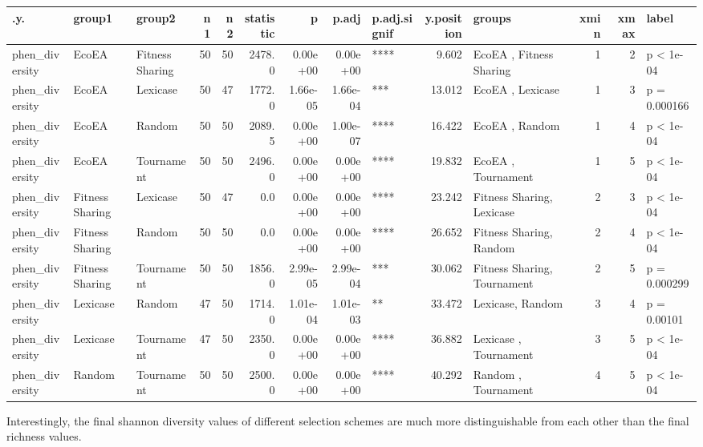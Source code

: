 \documentclass[]{book}
\begin{document}
\begin{table}
\centering
\begin{tabular}[t]{l|l|l|r|r|r|r|r|l|r|l|r|r|l}
\hline
.y. & group1 & group2 & n1 & n2 & statistic & p & p.adj & p.adj.signif & y.position & groups & xmin & xmax & label\\
\hline
phen\_diversity & EcoEA & Fitness Sharing & 50 & 50 & 2478.0 & 0.00e+00 & 0.00e+00 & **** & 9.602 & EcoEA          , Fitness Sharing & 1 & 2 & p < 1e-04\\
\hline
phen\_diversity & EcoEA & Lexicase & 50 & 47 & 1772.0 & 1.66e-05 & 1.66e-04 & *** & 13.012 & EcoEA   , Lexicase & 1 & 3 & p = 0.000166\\
\hline
phen\_diversity & EcoEA & Random & 50 & 50 & 2089.5 & 0.00e+00 & 1.00e-07 & **** & 16.422 & EcoEA , Random & 1 & 4 & p < 1e-04\\
\hline
phen\_diversity & EcoEA & Tournament & 50 & 50 & 2496.0 & 0.00e+00 & 0.00e+00 & **** & 19.832 & EcoEA     , Tournament & 1 & 5 & p < 1e-04\\
\hline
phen\_diversity & Fitness Sharing & Lexicase & 50 & 47 & 0.0 & 0.00e+00 & 0.00e+00 & **** & 23.242 & Fitness Sharing, Lexicase & 2 & 3 & p < 1e-04\\
\hline
phen\_diversity & Fitness Sharing & Random & 50 & 50 & 0.0 & 0.00e+00 & 0.00e+00 & **** & 26.652 & Fitness Sharing, Random & 2 & 4 & p < 1e-04\\
\hline
phen\_diversity & Fitness Sharing & Tournament & 50 & 50 & 1856.0 & 2.99e-05 & 2.99e-04 & *** & 30.062 & Fitness Sharing, Tournament & 2 & 5 & p = 0.000299\\
\hline
phen\_diversity & Lexicase & Random & 47 & 50 & 1714.0 & 1.01e-04 & 1.01e-03 & ** & 33.472 & Lexicase, Random & 3 & 4 & p = 0.00101\\
\hline
phen\_diversity & Lexicase & Tournament & 47 & 50 & 2350.0 & 0.00e+00 & 0.00e+00 & **** & 36.882 & Lexicase  , Tournament & 3 & 5 & p < 1e-04\\
\hline
phen\_diversity & Random & Tournament & 50 & 50 & 2500.0 & 0.00e+00 & 0.00e+00 & **** & 40.292 & Random    , Tournament & 4 & 5 & p < 1e-04\\
\hline
\end{tabular}
\end{table}

Interestingly, the final shannon diversity values of different selection schemes are much more distinguishable from each other than the final richness values.
\end{document}
